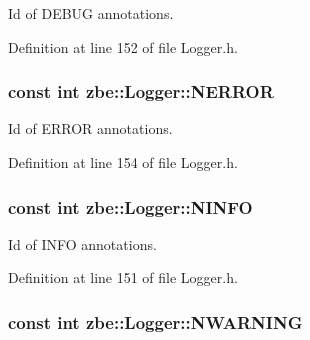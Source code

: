 Id of D\+E\+B\+U\+G annotations. 



Definition at line 152 of file Logger.\+h.

\hypertarget{classzbe_1_1_logger_a78cd96d72ec926945b9a90f4d120ca28}{}
\subsubsection[{N\+E\+R\+R\+O\+R}]{\setlength{\rightskip}{0pt plus 5cm}const int zbe\+::\+Logger\+::\+N\+E\+R\+R\+O\+R\hspace{0.3cm}{\ttfamily [static]}}\label{classzbe_1_1_logger_a78cd96d72ec926945b9a90f4d120ca28}


Id of E\+R\+R\+O\+R annotations. 



Definition at line 154 of file Logger.\+h.

\hypertarget{classzbe_1_1_logger_ad30e9493ec117daa24977bfa4cc883f1}{}
\subsubsection[{N\+I\+N\+F\+O}]{\setlength{\rightskip}{0pt plus 5cm}const int zbe\+::\+Logger\+::\+N\+I\+N\+F\+O\hspace{0.3cm}{\ttfamily [static]}}\label{classzbe_1_1_logger_ad30e9493ec117daa24977bfa4cc883f1}


Id of I\+N\+F\+O annotations. 



Definition at line 151 of file Logger.\+h.

\hypertarget{classzbe_1_1_logger_aba8b4f2b50b95b7df8475cd3cf5584b9}{}
\subsubsection[{N\+W\+A\+R\+N\+I\+N\+G}]{\setlength{\rightskip}{0pt plus 5cm}const int zbe\+::\+Logger\+::\+N\+W\+A\+R\+N\+I\+N\+G\hspace{0.3cm}{\ttfamily [static]}}\label{classzbe_1_1_logger_aba8b4f2b50b95b7df8475cd3cf5584b9}


